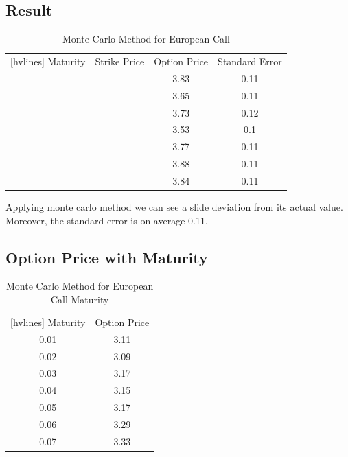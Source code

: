 \subsection{Result}

\begin{table}[H]
	\begin{center}
		\begin{NiceTabular}{|c|c|c|c|}[hvlines]
			 Maturity & Strike Price & Option Price & Standard Error\\ 
			 &  & 3.83 & 0.11 \\ 
			& & 3.65 & 0.11 \\
			& & 3.73 & 0.12 \\
			& & 3.53 & 0.1  \\
			& & 3.77 & 0.11 \\
			& & 3.88 & 0.11 \\
			& & 3.84 & 0.11 \\
		\end{NiceTabular}
	\end{center}
	\caption{Monte Carlo Method for European Call}
\end{table}


\noindent Applying monte carlo method we can see a slide deviation from its actual value. Moreover, the standard error is on average 0.11.

\subsection{Option Price with Maturity}



\begin{table}[H]
	\begin{center}
		\begin{NiceTabular}{|c|c|}[hvlines]
			 Maturity & Option Price\\ 
			0.01 & 3.11 \\ 
			0.02 & 3.09 \\
			0.03 & 3.17 \\
			0.04 & 3.15  \\
			0.05 & 3.17 \\
			0.06 & 3.29 \\
			0.07 & 3.33 \\
		\end{NiceTabular}
	\end{center}
	\caption{Monte Carlo Method for European Call Maturity}
\end{table}

